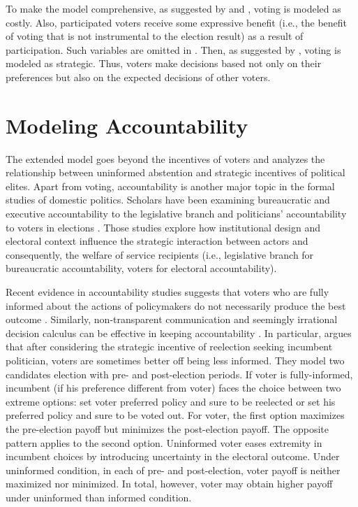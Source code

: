 \documentclass[letterpaper, 12pt]{article}
\begin{document}
    \par To make the model comprehensive, as suggested by \cite{Downs1957anec} and \cite{Riker1968thof}, voting is modeled as costly. Also, participated voters receive some expressive benefit (i.e., the benefit of voting that is not instrumental to the election result) as a result of participation. Such variables are omitted in \cite{Feddersen1996thsw, Feddersen1999abin}. Then, as suggested by \cite{Feddersen1996thsw}, voting is modeled as strategic. Thus, voters make decisions based not only on their preferences but also on the expected decisions of other voters.
    
    \section*{Modeling Accountability}

    \par The extended model goes beyond the incentives of voters and analyzes the relationship between uninformed abstention and strategic incentives of political elites. Apart from voting, accountability is another major topic in the formal studies of domestic politics. Scholars have been examining bureaucratic and executive accountability to the legislative branch \citep[e.g.,][]{Gailmard2013lewh} and politicians' accountability to voters in elections \citep[e.g.,][]{Ashworth2012elac}. Those studies explore how institutional design and electoral context influence the strategic interaction between actors and consequently, the welfare of service recipients (i.e., legislative branch for bureaucratic accountability, voters for electoral accountability).
    
    \par Recent evidence in accountability studies suggests that voters who are fully informed about the actions of policymakers do not necessarily produce the best outcome \citep{Ashworth2014isvo, Prato2016thvo}. Similarly, non-transparent communication and seemingly irrational decision calculus can be effective in keeping accountability \citep{Patty2017expo,Gailmard2019prpr}. In particular, \cite{Ashworth2014isvo} argues that after considering the strategic incentive of reelection seeking incumbent politician, voters are sometimes better off being less informed. They model two candidates election with pre- and post-election periods. If voter is fully-informed, incumbent (if his preference different from voter) faces the choice between two extreme options: set voter preferred policy and sure to be reelected or set his preferred policy and sure to be voted out. For voter, the first option maximizes the pre-election payoff but minimizes the post-election payoff. The opposite pattern applies to the second option. Uninformed voter eases extremity in incumbent choices by introducing uncertainty in the electoral outcome. Under uninformed condition, in each of pre- and post-election, voter payoff is neither maximized nor minimized. In total, however, voter may obtain higher payoff under uninformed than informed condition.
        
\end{document}

